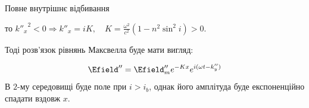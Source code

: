 \documentclass[onlytextwidth]{beamer}
\begin{document}
\begin{frame}{Повне внутрішнє відбивання}
{	то ${k''_x}^2 < 0 \Rightarrow k''_x = i K, \quad K =   \frac{\omega^2}{c^2}(1 - n^2\sin^2 i) > 0$.

	Тоді розв'язок рівнянь Максвелла буде мати вигляд:

	\[
		\Efield'' = \Efield''_me^{-Kx} e^{i(\omega t - {k''_y})}
	\]
	\alert{В $2$-му середовищі буде поле при $i > i_b$, однак його амплітуда буде експоненційно спадати вздовж $x$}.
	}
\end{frame}
\end{document}
